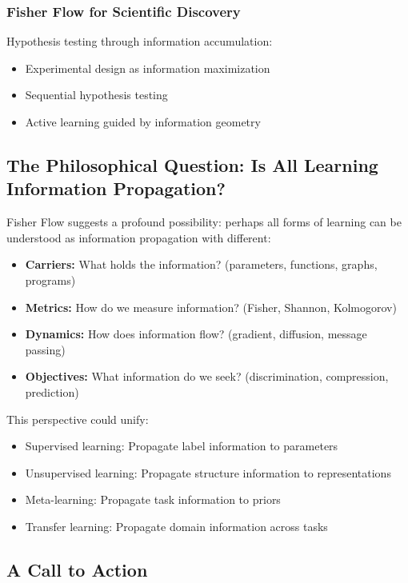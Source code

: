 \documentclass[11pt]{article}
\begin{document}
\subsubsection{Fisher Flow for Scientific Discovery}
Hypothesis testing through information accumulation:
\begin{itemize}
\item Experimental design as information maximization
\item Sequential hypothesis testing
\item Active learning guided by information geometry
\end{itemize}

\subsection{The Philosophical Question: Is All Learning Information Propagation?}

Fisher Flow suggests a profound possibility: perhaps all forms of learning can be understood as information propagation with different:
\begin{itemize}
\item \textbf{Carriers:} What holds the information? (parameters, functions, graphs, programs)
\item \textbf{Metrics:} How do we measure information? (Fisher, Shannon, Kolmogorov)
\item \textbf{Dynamics:} How does information flow? (gradient, diffusion, message passing)
\item \textbf{Objectives:} What information do we seek? (discrimination, compression, prediction)
\end{itemize}

This perspective could unify:
\begin{itemize}
\item Supervised learning: Propagate label information to parameters
\item Unsupervised learning: Propagate structure information to representations
\item Meta-learning: Propagate task information to priors
\item Transfer learning: Propagate domain information across tasks
\end{itemize}

\subsection{A Call to Action}
\end{document}
